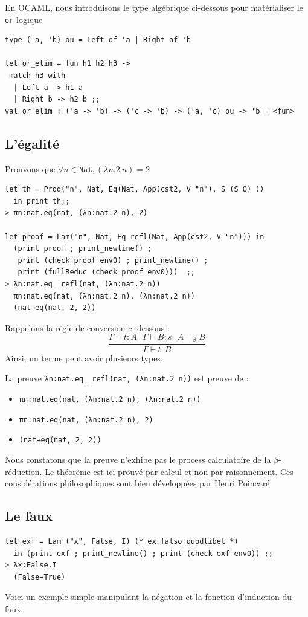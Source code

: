 \documentclass[11pt]{book}
\begin{document}
En OCAML, nous introduisons le type algébrique ci-dessous pour matérialiser le \verb+or+ logique
\begin{Verbatim}
type ('a, 'b) ou = Left of 'a | Right of 'b	

let or_elim = fun h1 h2 h3 ->
 match h3 with
  | Left a -> h1 a
  | Right b -> h2 b ;;
val or_elim : ('a -> 'b) -> ('c -> 'b) -> ('a, 'c) ou -> 'b = <fun>
\end{Verbatim}

\subsection{L'égalité}
Prouvons que $\forall n \in \mathtt{Nat}, (\lambda n.2\  n) = 2$
\begin{Verbatim}
let th = Prod("n", Nat, Eq(Nat, App(cst2, V "n"), S (S O) )) 
  in print th;;
> πn:nat.eq(nat, (λn:nat.2 n), 2)

let proof = Lam("n", Nat, Eq_refl(Nat, App(cst2, V "n"))) in 
  (print proof ; print_newline() ;
   print (check proof env0) ; print_newline() ; 
   print (fullReduc (check proof env0)))  ;;
> λn:nat.eq _refl(nat, (λn:nat.2 n))
  πn:nat.eq(nat, (λn:nat.2 n), (λn:nat.2 n))
  (nat→eq(nat, 2, 2))
\end{Verbatim}
Rappelons la règle de conversion ci-dessous :
$$
\frac{\Gamma ⊢ t:A \ \ \     \Gamma ⊢ B:s \ \ \     A=_\beta B}{\Gamma ⊢ t:B}
$$
Ainsi, un terme peut avoir plusieurs types.

\noindent La preuve \verb+λn:nat.eq _refl(nat, (λn:nat.2 n))+ est preuve de :
\begin{itemize}
 \item \verb+πn:nat.eq(nat, (λn:nat.2 n), (λn:nat.2 n))+
 \item \verb+πn:nat.eq(nat, (λn:nat.2 n), 2)+
 \item \verb+(nat→eq(nat, 2, 2))+
\end{itemize}
Nous constatons que la preuve n'exhibe pas le process calculatoire de la $\beta$-réduction.
Le théorème est ici prouvé par calcul et non par raisonnement. Ces considérations philosophiques sont bien développées
par Henri Poincaré\cite{poincare}

\subsection{Le faux}

\begin{Verbatim}
let exf = Lam ("x", False, I) (* ex falso quodlibet *)
  in (print exf ; print_newline() ; print (check exf env0)) ;;
> λx:False.I
  (False→True) 
\end{Verbatim}
Voici un exemple simple manipulant la négation et la fonction d'induction du faux.  
\end{document}
